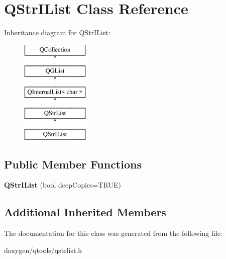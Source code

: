 \hypertarget{class_q_str_i_list}{}\section{Q\+Str\+I\+List Class Reference}
\label{class_q_str_i_list}
Inheritance diagram for Q\+Str\+I\+List\+:\begin{figure}[H]
\begin{center}
\leavevmode
\includegraphics[height=5.000000cm]{class_q_str_i_list}
\end{center}
\end{figure}
\subsection*{Public Member Functions}
\begin{DoxyCompactItemize}
\item 
\mbox{\label{class_q_str_i_list_a8148c046c27581392ce052c70cbc3e0b}} 
{\bfseries Q\+Str\+I\+List} (bool deep\+Copies=T\+R\+UE)
\end{DoxyCompactItemize}
\subsection*{Additional Inherited Members}


The documentation for this class was generated from the following file\+:\begin{DoxyCompactItemize}
\item 
doxygen/qtools/qstrlist.\+h\end{DoxyCompactItemize}
